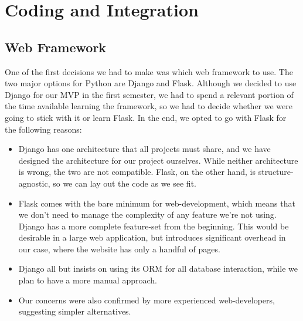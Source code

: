 \documentclass[main.tex]{subfiles}
\begin{document}
\section{Coding and Integration}
\subsection{Web Framework}
One of the first decisions we had to make was which web framework to use. The two major options for Python are Django and Flask. Although we decided to use Django for our MVP in the first semester, we had to spend a relevant portion of the time available learning the framework, so we had to decide whether we were going to stick with it or learn Flask. In the end, we opted to go with Flask for the following reasons:

\begin{itemize}
    \item Django has one architecture that all projects must share, and we have designed the architecture for our project ourselves. While neither architecture is wrong, the two are not compatible. Flask, on the other hand, is structure-agnostic, so we can lay out the code as we see fit.

\item Flask comes with the bare minimum for web-development, which means that we don't need to manage the complexity of any feature we're not using. Django has a more complete feature-set from the beginning. This would be desirable in a large web application, but introduces significant overhead in our case, where the website has only a handful of pages.

\item Django all but insists on using its ORM for all database interaction, while we plan to have a more manual approach.

\item Our concerns were also confirmed by more experienced web-developers, suggesting simpler alternatives.

\end{itemize}

\iffalse
Sources:
https://www.djangoproject.com/

https://flask.palletsprojects.com/en/1.1.x/

https://www.codementor.io/@garethdwyer/flask-vs-django-why-flask-might-be-better-4xs7mdf8v

http://ddi-dev.com/blog/programming/django-vs-flask-which-better-your-web-app/

https://coderseye.com/django-vs-flask
\fi
\end{document}
